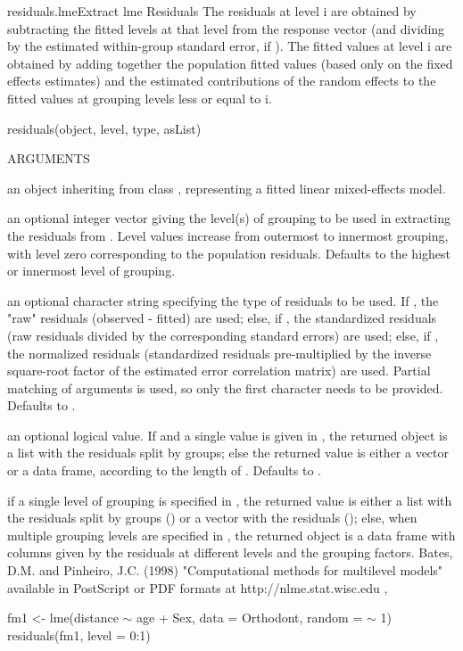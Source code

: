 \documentclass[pdftex]{article} \usepackage{url,graphicx}
\renewcommand{\Twiddle}{\mbox{\(\sim\)}}
\begin{document}
\begin{Helpfile}{residuals.lme}{Extract lme Residuals}
The residuals at level i are obtained by subtracting the fitted
levels at that level from the response vector (and dividing
by the estimated within-group standard error, if
). The fitted values at level i are obtained
by adding together the population fitted values (based only on the
fixed effects estimates) and the estimated contributions of the random
effects to the fitted values at grouping levels less or equal to
i.
\begin{Example}
residuals(object, level, type, asList)
\end{Example}
\begin{Argument}{ARGUMENTS}
\item[\Co{object:}]
an object inheriting from class , representing
a fitted linear mixed-effects model.
\item[\Co{level:}]
an optional integer vector giving the level(s) of grouping
to be used in extracting the residuals from . Level
values increase from outermost to innermost grouping, with
level zero corresponding to the population residuals. Defaults to
the highest or innermost level of grouping.
\item[\Co{type:}]
an optional character string specifying the type of
residuals to be used. If , the "raw" residuals
(observed - fitted) are used; else, if , the
standardized residuals (raw residuals divided by the corresponding
standard errors) are used; else, if , the
normalized residuals (standardized residuals pre-multiplied by the
inverse square-root factor of the estimated error correlation
matrix) are used. Partial matching of arguments is used, so only the
first character needs to be provided. Defaults to .
\item[\Co{asList:}]
an optional logical value. If  and a single
value is given in , the returned object is a list with
the residuals split by groups; else the returned value is
either a vector or a data frame, according to the length of
. Defaults to .
\end{Argument}
if a single level of grouping is specified in , the
returned value is either a list with the residuals split by groups
() or a vector with the residuals
(); else, when multiple grouping levels are
specified in , the returned object is a data frame with
columns given by the residuals at different levels and the grouping
factors.
Bates, D.M. and Pinheiro, J.C. (1998) "Computational methods for
multilevel models" available in PostScript or PDF formats at
http://nlme.stat.wisc.edu
, 
\need 15pt
\vspace{-16pt}
\begin{Example}
fm1 <- lme(distance {\Twiddle} age + Sex, data = Orthodont, random = {\Twiddle} 1)
residuals(fm1, level = 0:1)
\end{Example}
\end{Helpfile}
\end{document}
